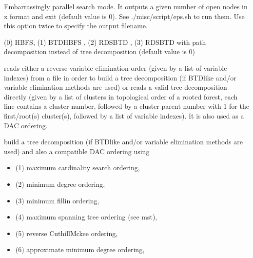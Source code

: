 \documentclass[letterpaper,10pt,openany,oneside,english]{sphinxmanual}
\begin{document}
\begin{description}
\sphinxAtStartPar
Embarrassingly parallel search mode. It outputs a given number of open nodes in \sphinxhyphen{}x format and exit  (default value is 0).
See ./misc/script/eps.sh to run them. Use this option twice to specify the output filename.

\sphinxAtStartPar
(0) HBFS, (1) BTD\sphinxhyphen{}HBFS  ,
(2) RDS\sphinxhyphen{}BTD , (3) RDS\sphinxhyphen{}BTD with path decomposition
instead of tree decomposition  (default value is 0)

\sphinxAtStartPar
reads either a reverse variable elimination order (given by a list
of variable indexes) from a file
in order to build a tree decomposition (if BTD\sphinxhyphen{}like and/or variable
elimination methods are used) or reads a valid tree decomposition directly (given by a list of clusters in topological order of a rooted forest, each line contains a cluster number, followed by a cluster parent number with \sphinxhyphen{}1 for the first/root(s) cluster(s), followed by a list of variable indexes). It is also used as a DAC ordering.

\sphinxAtStartPar
build a tree decomposition (if BTD\sphinxhyphen{}like
and/or variable elimination methods are used) and also a compatible
DAC ordering using
\begin{itemize}
\item {} 
\sphinxAtStartPar
(\sphinxhyphen{}1) maximum cardinality search ordering,

\item {} 
\sphinxAtStartPar
(\sphinxhyphen{}2) minimum degree ordering,

\item {} 
\sphinxAtStartPar
(\sphinxhyphen{}3) minimum fill\sphinxhyphen{}in ordering,

\item {} 
\sphinxAtStartPar
(\sphinxhyphen{}4) maximum spanning tree ordering (see \sphinxhyphen{}mst),

\item {} 
\sphinxAtStartPar
(\sphinxhyphen{}5) reverse Cuthill\sphinxhyphen{}Mckee ordering,

\item {} 
\sphinxAtStartPar
(\sphinxhyphen{}6) approximate minimum degree ordering,


\end{itemize}
\end{description}
\end{document}
